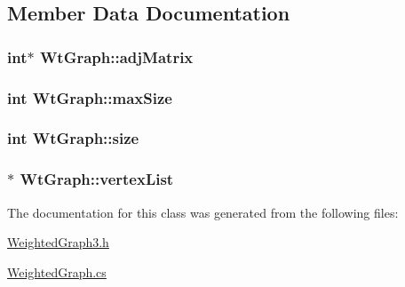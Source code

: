 \subsection{\-Member \-Data \-Documentation}
\hypertarget{class_wt_graph_a1fa6d8f87dc5c82a02e94c58a8291c09}{
\subsubsection[{adj\-Matrix}]{\setlength{\rightskip}{0pt plus 5cm}int$\ast$ {\bf \-Wt\-Graph\-::adj\-Matrix}}}\label{class_wt_graph_a1fa6d8f87dc5c82a02e94c58a8291c09}
\hypertarget{class_wt_graph_af9aaa9d6a0263b17803d8da652137ebf}{
\subsubsection[{max\-Size}]{\setlength{\rightskip}{0pt plus 5cm}int {\bf \-Wt\-Graph\-::max\-Size}}}\label{class_wt_graph_af9aaa9d6a0263b17803d8da652137ebf}
\hypertarget{class_wt_graph_a295d3a82399a2b7d02b90779266b0ac5}{
\subsubsection[{size}]{\setlength{\rightskip}{0pt plus 5cm}int {\bf \-Wt\-Graph\-::size}}}\label{class_wt_graph_a295d3a82399a2b7d02b90779266b0ac5}
\hypertarget{class_wt_graph_a6e99e08584fb7495542310d854d194fb}{
\subsubsection[{vertex\-List}]{$\ast$ {\bf \-Wt\-Graph\-::vertex\-List}}}\label{class_wt_graph_a6e99e08584fb7495542310d854d194fb}


\-The documentation for this class was generated from the following files\-:\begin{DoxyCompactItemize}
\item 
\hyperlink{_weighted_graph3_8h}{\-Weighted\-Graph3.\-h}\item 
\hyperlink{_weighted_graph_8cs}{\-Weighted\-Graph.\-cs}\end{DoxyCompactItemize}
